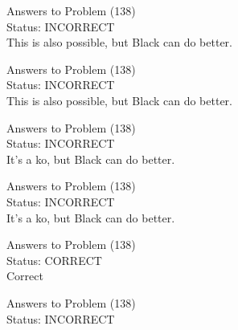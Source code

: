 \documentclass[11pt]{article}
\begin{document}
\begin{minipage}[t]{0.5\textwidth}
  {\centering
  
  Answers to Problem (138)\\
  Status: INCORRECT\\
  This is also possible, but Black can do better.\\
  }
\end{minipage}
\begin{minipage}[t]{0.5\textwidth}
  {\centering
  
  Answers to Problem (138)\\
  Status: INCORRECT\\
  This is also possible, but Black can do better.\\
  }
\end{minipage}
\begin{minipage}[t]{0.5\textwidth}
  {\centering
  
  Answers to Problem (138)\\
  Status: INCORRECT\\
  It's a ko, but Black can do better.\\
  }
\end{minipage}
\begin{minipage}[t]{0.5\textwidth}
  {\centering
  
  Answers to Problem (138)\\
  Status: INCORRECT\\
  It's a ko, but Black can do better.\\
  }
\end{minipage}
\begin{minipage}[t]{0.5\textwidth}
  {\centering
  
  Answers to Problem (138)\\
  Status: CORRECT\\
  Correct\\
  }
\end{minipage}
\begin{minipage}[t]{0.5\textwidth}
  {\centering
  
  Answers to Problem (138)\\
  Status: INCORRECT\\
  
  }
\end{minipage}
\end{document}
